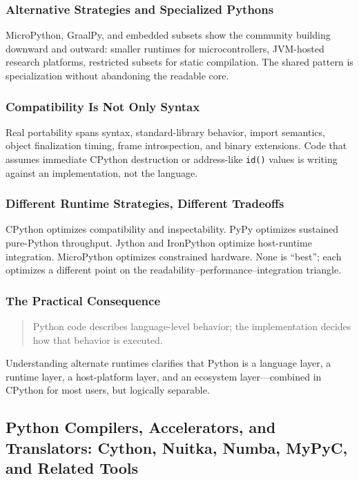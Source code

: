 \documentclass[a4paper,twoside]{report}
\begin{document}
\subsubsection{Alternative Strategies and Specialized Pythons}

MicroPython, GraalPy, and embedded subsets show the community building downward and outward: smaller runtimes for microcontrollers, JVM-hosted research platforms, restricted subsets for static compilation. The shared pattern is specialization without abandoning the readable core.

\subsubsection{Compatibility Is Not Only Syntax}

Real portability spans syntax, standard-library behavior, import semantics, object finalization timing, frame introspection, and binary extensions. Code that assumes immediate CPython destruction or address-like \texttt{id()} values is writing against an implementation, not the language.

\subsubsection{Different Runtime Strategies, Different Tradeoffs}

CPython optimizes compatibility and inspectability. PyPy optimizes sustained pure-Python throughput. Jython and IronPython optimize host-runtime integration. MicroPython optimizes constrained hardware. None is ``best''; each optimizes a different point on the readability--performance--integration triangle.

\subsubsection{The Practical Consequence}

\begin{quote}
Python code describes language-level behavior; the implementation decides how that behavior is executed.
\end{quote}

Understanding alternate runtimes clarifies that Python is a language layer, a runtime layer, a host-platform layer, and an ecosystem layer---combined in CPython for most users, but logically separable.


\subsection{Python Compilers, Accelerators, and Translators: Cython, Nuitka, Numba, MyPyC, and Related Tools}
\end{document}
